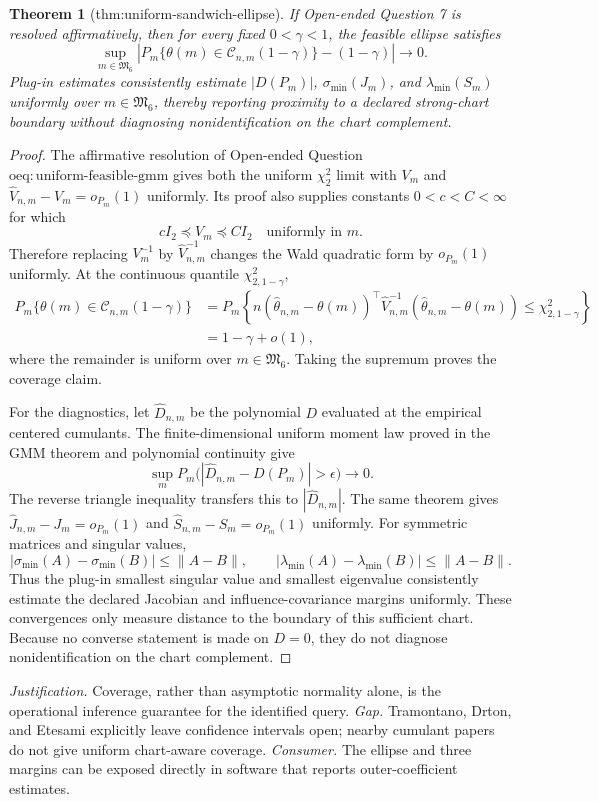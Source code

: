 \documentclass{article}
\newtheorem{theorem}{Theorem}
\begin{document}
\begin{theorem}[thm:uniform-sandwich-ellipse]\label{thm:uniform-sandwich-ellipse}
If Open-ended Question 7 is resolved affirmatively, then for every fixed \(0<\gamma<1\), the feasible ellipse satisfies \[\sup_{m\in\mathfrak M_6}\left|P_m\{\theta(m)\in\mathcal C_{n,m}(1-\gamma)\}-(1-\gamma)\right|\longrightarrow0.\] Plug-in estimates consistently estimate \(|D(P_m)|\), \(\sigma_{\min}(J_m)\), and \(\lambda_{\min}(S_m)\) uniformly over \(m\in\mathfrak M_6\), thereby reporting proximity to a declared strong-chart boundary without diagnosing nonidentification on the chart complement.
\end{theorem}
\begin{proof}
The affirmative resolution of Open-ended Question \(\mathrm{oeq:uniform\mbox{-}feasible\mbox{-}gmm}\) gives both the uniform \(\chi^2_2\) limit with \(V_m\) and \(\widehat V_{n,m}-V_m=o_{P_m}(1)\) uniformly. Its proof also supplies constants \(0<c<C<\infty\) for which
\[
cI_2\preceq V_m\preceq CI_2
\quad\text{uniformly in }m.
\]
Therefore replacing \(V_m^{-1}\) by \(\widehat V_{n,m}^{-1}\) changes the Wald quadratic form by \(o_{P_m}(1)\) uniformly. At the continuous quantile \(\chi^2_{2,1-\gamma}\),
\[
\begin{aligned}
P_m\{\theta(m)\in\mathcal C_{n,m}(1-\gamma)\}
&=P_m\!\left\{n(\widehat\theta_{n,m}-\theta(m))^\top
\widehat V_{n,m}^{-1}(\widehat\theta_{n,m}-\theta(m))
\le\chi^2_{2,1-\gamma}\right\}\\
&=1-\gamma+o(1),
\end{aligned}
\]
where the remainder is uniform over \(m\in\mathfrak M_6\). Taking the supremum proves the coverage claim.

For the diagnostics, let \(\widehat D_{n,m}\) be the polynomial \(D\) evaluated at the empirical centered cumulants. The finite-dimensional uniform moment law proved in the GMM theorem and polynomial continuity give
\[
\sup_mP_m\bigl(|\widehat D_{n,m}-D(P_m)|>\epsilon\bigr)\to0.
\]
The reverse triangle inequality transfers this to \(|\widehat D_{n,m}|\). The same theorem gives \(\widehat J_{n,m}-J_m=o_{P_m}(1)\) and \(\widehat S_{n,m}-S_m=o_{P_m}(1)\) uniformly. For symmetric matrices and singular values,
\[
|\sigma_{\min}(A)-\sigma_{\min}(B)|\le\|A-B\|,
\qquad
|\lambda_{\min}(A)-\lambda_{\min}(B)|\le\|A-B\|.
\]
Thus the plug-in smallest singular value and smallest eigenvalue consistently estimate the declared Jacobian and influence-covariance margins uniformly. These convergences only measure distance to the boundary of this sufficient chart. Because no converse statement is made on \(D=0\), they do not diagnose nonidentification on the chart complement.
\end{proof}
\par\smallskip\noindent \textit{Justification.} Coverage, rather than asymptotic normality alone, is the operational inference guarantee for the identified query. \textit{Gap.} Tramontano, Drton, and Etesami explicitly leave confidence intervals open; nearby cumulant papers do not give uniform chart-aware coverage. \textit{Consumer.} The ellipse and three margins can be exposed directly in software that reports outer-coefficient estimates.
\end{document}
